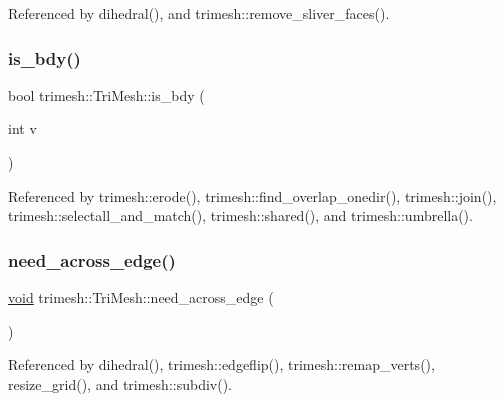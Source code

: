 Referenced by dihedral(), and trimesh\+::remove\+\_\+sliver\+\_\+faces().

\mbox{\label{classtrimesh_1_1TriMesh_a176319b9d4c9c9e48047ad3c94aea083}} 
\subsubsection{\texorpdfstring{is\+\_\+bdy()}{is\_bdy()}}
{\footnotesize\ttfamily bool trimesh\+::\+Tri\+Mesh\+::is\+\_\+bdy (\begin{DoxyParamCaption}\item[{int}]{v }\end{DoxyParamCaption})\hspace{0.3cm}{\ttfamily [inline]}}



Referenced by trimesh\+::erode(), trimesh\+::find\+\_\+overlap\+\_\+onedir(), trimesh\+::join(), trimesh\+::selectall\+\_\+and\+\_\+match(), trimesh\+::shared(), and trimesh\+::umbrella().

\mbox{\label{classtrimesh_1_1TriMesh_a06c7c2c7a16638317d97ecce6dc0e920}} 
\subsubsection{\texorpdfstring{need\+\_\+across\+\_\+edge()}{need\_across\_edge()}}
{\footnotesize\ttfamily \hyperlink{namespacetrimesh_a784ddfd979e1c579bda795a8edfc3f43}{void} trimesh\+::\+Tri\+Mesh\+::need\+\_\+across\+\_\+edge (\begin{DoxyParamCaption}{ }\end{DoxyParamCaption})}



Referenced by dihedral(), trimesh\+::edgeflip(), trimesh\+::remap\+\_\+verts(), resize\+\_\+grid(), and trimesh\+::subdiv().

\mbox{\label{classtrimesh_1_1TriMesh_a6ee26a07e489c66a6969ee66e98929b0}} 
